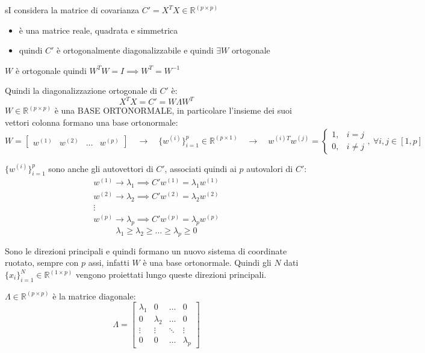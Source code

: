 	\begin{myboxb}
		sI considera la matrice di covarianza $C'=X^TX\in\mathbb{R}^{(p\times p)}$
		
		\begin{itemize}[itemsep=3pt, topsep=3pt]
		  \item è una matrice reale, quadrata e simmetrica
		  \item quindi $C'$ è ortogonalmente diagonalizzabile e quindi $\exists W$ ortogonale
		\end{itemize}
		
		$W$ è ortogonale quindi $W^TW=I\implies W^T=W^{-1}$
		
		Quindi la diagonalizzazione ortogonale di $C'$ è:
		$$
		X^TX=C'=W\Lambda W^T
		$$
		$W\in\mathbb{R}^{(p\times p)}$ è una BASE ORTONORMALE, in particolare l’insieme dei suoi vettori colonna formano una base ortonormale:
		$$
		W=\begin{bmatrix}
			w^{(1)} & w^{(2)} & \dots &w^{(p)}
		\end{bmatrix} \quad\rightarrow\quad \Big\{w^{(i)}\Big\}_{i=1}^p\in\mathbb{R}^{(p\times 1)} \quad\rightarrow\quad w^{(i)T}w^{(j)}=\begin{cases}
			1, &i=j\\
			0, & i\ne j
		\end{cases},\ \forall i,j\in[1,p]
		$$
		
		$\{w^{(i)}\}_{i=1}^p$ sono anche gli autovettori di $C'$, associati quindi ai $p$ autovalori di $C'$:
		\begin{gather*}
		  w^{(1)}\rightarrow\lambda_1\implies C'w^{(1)}=\lambda_1w^{(1)} \\
		  w^{(2)}\rightarrow\lambda_2\implies C'w^{(2)}=\lambda_2w^{(2)} \\
		  \vdots \\
		  w^{(p)}\rightarrow\lambda_p\implies C'w^{(p)}=\lambda_pw^{(p)}
		\end{gather*}
		$$
		\lambda_1 \ge \lambda_2 \ge \dots \ge \lambda_p \ge 0
		$$
		
		Sono le direzioni principali e quindi formano un nuovo sistema di coordinate ruotato, sempre con $p$ assi, infatti $W$ è una base ortonormale. Quindi gli $N$ dati $\{x_i\}_{i=1}^N\in\mathbb{R}^{(1\times p)}$ vengono proiettati lungo queste direzioni principali.\myvspace
		
		$\Lambda\in\mathbb{R}^{(p\times p)}$ è la matrice diagonale:
		$$
		\Lambda=\begin{bmatrix}
			\lambda_1 & 0 & \dots & 0 \\
			0 & \lambda_2 & \dots & 0\\
			\vdots & \vdots & \ddots & \vdots \\
			0 & 0 & \dots & \lambda_p
		\end{bmatrix}
		$$
	\end{myboxb}
